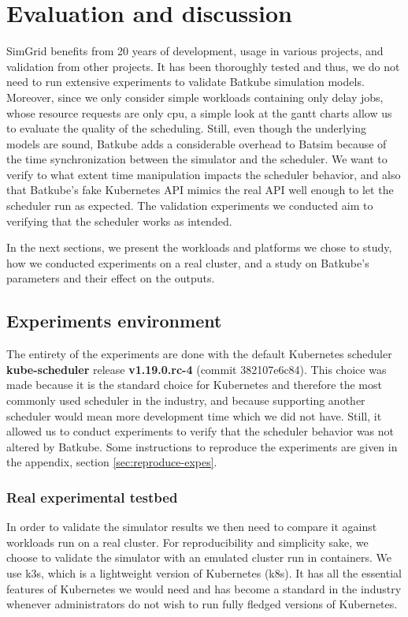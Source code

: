 \chapter{Evaluation and discussion}

SimGrid benefits from 20 years of development, usage in various projects, and
validation from other projects. It has been thoroughly tested and thus, we do
not need to run extensive experiments to validate Batkube simulation models.
Moreover, since we only consider simple workloads containing only delay jobs,
whose resource requests are only cpu, a simple look at the gantt charts allow
us to evaluate the quality of the scheduling. Still, even though the underlying
models are sound, Batkube adds a considerable overhead to Batsim because of the
time synchronization between the simulator and the scheduler. We want to verify
to what extent time manipulation impacts the scheduler behavior, and also that
Batkube's fake Kubernetes API mimics the real API well enough to let the
scheduler run as expected. The validation experiments we conducted aim to
verifying that the scheduler works as intended.

In the next sections, we present the workloads and platforms we chose to study,
how we conducted experiments on a real cluster, and a study on Batkube's
parameters and their effect on the outputs.

\section{Experiments environment}

The entirety of the experiments are done with the default Kubernetes scheduler
\textbf{kube-scheduler} release \textbf{v1.19.0.rc-4} (commit 382107e6c84).
This choice was made because it is the standard choice for Kubernetes and
therefore the most commonly used scheduler in the industry, and because
supporting another scheduler would mean more development time which we did not
have. Still, it allowed us to conduct experiments to verify that the scheduler
behavior was not altered by Batkube. Some instructions to reproduce the
experiments are given in the appendix, section \ref{sec:reproduce-expes}.

\subsection{Real experimental testbed}

In order to validate the simulator results we then need to compare it against
workloads run on a real cluster. For reproducibility and simplicity sake, we
choose to validate the simulator with an emulated cluster run in containers. We
use k3s, which is a lightweight version of Kubernetes (k8s). It has all the
essential features of Kubernetes we would need and has become a standard in the
industry whenever administrators do not wish to run fully fledged versions of
Kubernetes.\\


